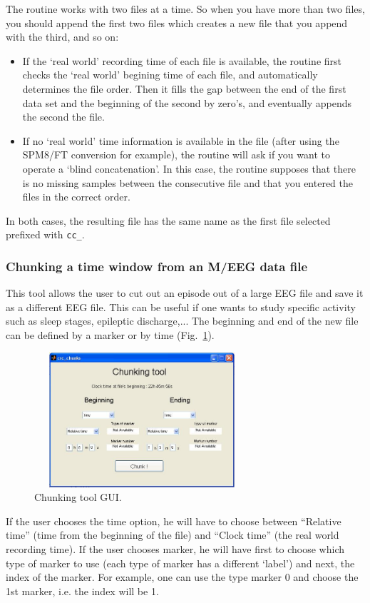 \documentclass[a4paper,titlepage]{article}
\newcommand{\bi}{\begin{itemize}}
\newcommand{\ei}{\end{itemize}}
\begin{document}
The routine works with two files at a time. So when you have more than two files, you should append the first two files which creates a new file that you append with the third, and so on:
\bi
\item If the `real world' recording time of each file is available, the routine first checks the `real world' begining time of each file, and automatically determines the file order. Then it fills the gap between the end of the first data set and the beginning of the second by zero's, and eventually appends the second the file.
\item If no `real world' time information is available in the file (after using the SPM8/FT conversion for example), the routine will ask if you want to operate a `blind concatenation'. In this case, the routine supposes that there is no missing samples between the consecutive file and that you entered the files in the correct order.
\ei
In both cases, the resulting file has the same name as the first file selected prefixed with {\tt cc\_}. 

\subsubsection{Chunking a time window from an M/EEG data file}
\label{sec:chunking}
This tool allows the user to cut out an episode out of a large EEG file and save it as a different EEG file. This can be useful if one wants to study specific activity such as sleep stages, epileptic discharge,... The beginning and end of the new file can be defined by a marker or by time (Fig.~\ref{fig:TB_chunk}).

\begin{figure}[ht]
	\centering
		\includegraphics[width=8cm,height=5cm]{images/FIG10_crc_chunk.jpg}
	\caption{Chunking tool GUI.
	\label{fig:TB_chunk}}
\end{figure}

If the user chooses the time option, he will have to choose between ``Relative time'' (time from the beginning of the file) and ``Clock time'' (the real world recording time). If the user chooses marker, he will have first to choose which type of marker to use (each type of marker has a different `label') and next, the index of the marker. For example, one can use the type marker 0 and choose the 1st marker, i.e. the index will be 1.
\end{document}
